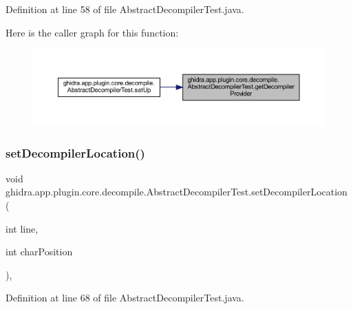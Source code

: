 Definition at line 58 of file Abstract\+Decompiler\+Test.\+java.

Here is the caller graph for this function\+:
\nopagebreak
\begin{figure}[H]
\begin{center}
\leavevmode
\includegraphics[width=350pt]{classghidra_1_1app_1_1plugin_1_1core_1_1decompile_1_1_abstract_decompiler_test_a3500d6885e44afbd2c17791b7cbef0fe_icgraph}
\end{center}
\end{figure}
\mbox{\label{classghidra_1_1app_1_1plugin_1_1core_1_1decompile_1_1_abstract_decompiler_test_ab96f45f00a2a62697ba177bd42a608c6}} 
\subsubsection{\texorpdfstring{setDecompilerLocation()}{setDecompilerLocation()}}
{\footnotesize\ttfamily void ghidra.\+app.\+plugin.\+core.\+decompile.\+Abstract\+Decompiler\+Test.\+set\+Decompiler\+Location (\begin{DoxyParamCaption}\item[{int}]{line,  }\item[{int}]{char\+Position }\end{DoxyParamCaption})\hspace{0.3cm}{\ttfamily [inline]}, {\ttfamily [protected]}}



Definition at line 68 of file Abstract\+Decompiler\+Test.\+java.

